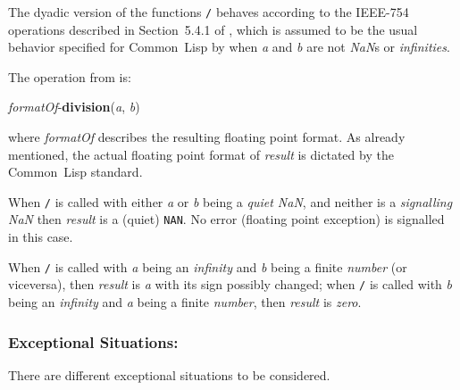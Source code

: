 \documentclass[10pt,fleqn]{article}
\newcommand{\CL}{\textsf{Common~Lisp}}
\newcommand{\code}[1]{\texttt{#1}}
\newcommand{\clieeeterm}[1]{\textit{#1}}
\newcommand{\varname}[1]{\textit{#1}}
\newcommand{\clterm}[1]{\textit{#1}}
\newcommand{\IEEEFPStd}{IEEE-754}
\newcommand{\DExceptional}{\subsubsection*{Exceptional Situations:}}
\begin{document}
The dyadic version of the functions \code{/} behaves
according to the \IEEEFPStd{} operations described in Section~5.4.1 of
\cite{2008:IEEE-754}, which is assumed to be the usual behavior specified
for \CL{} by \cite{1996:ANSIHyperSpec} when \varname{a} and \varname{b} are
not \emph{NaN}s or \emph{infinities}.


\noindent
The operation from \cite{2008:IEEE-754} is:

\vspace*{3mm}

\noindent
\textit{formatOf}-\textbf{division}(\varname{a}, \varname{b})

\vspace*{3mm}

\noindent
where \textit{formatOf} describes the resulting floating point
format.  As already mentioned, the actual floating point format of
\varname{result} is dictated by the \CL{} standard.

When \code{/} is called with either \varname{a} or \varname{b} being a
\emph{quiet NaN}, and neither is a \emph{signalling NaN} then
\varname{result} is a (quiet) \code{NAN}.  No error (floating point
exception) is signalled in this case.

When \code{/} is called with \varname{a} being an 
\clieeeterm{infinity} and \varname{b} being a finite \clterm{number}
(or viceversa), then \varname{result} is \varname{a} with its sign
possibly changed; when \code{/} is
called with \varname{b} being an \clieeeterm{infinity} and \varname{a}
being a finite \clterm{number}, then \varname{result}
is \clieeeterm{zero}.


\DExceptional{}

There are different exceptional situations to be considered.
\end{document}
